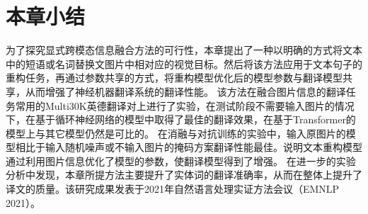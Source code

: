 






\section{本章小结}
为了探究显式跨模态信息融合方法的可行性，本章提出了一种以明确的方式将文本中的短语或名词替换文图片中相对应的视觉目标。然后将该方法应用于文本句子的重构任务，再通过参数共享的方式，将重构模型优化后的模型参数与翻译模型共享，从而增强了神经机器翻译系统的翻译性能。
该方法在融合图片信息的翻译任务常用的Multi30K英德翻译对上进行了实验，在测试阶段不需要输入图片的情况下，在基于循环神经网络的模型中取得了最佳的翻译效果，在基于Transformer的模型上与其它模型仍然是可比的。
在消融与对抗训练的实验中，输入原图片的模型相比于输入随机噪声或不输入图片的掩码方案翻译性能最佳。说明文本重构模型通过利用图片信息优化了模型的参数，使翻译模型得到了增强。
在进一步的实验分析中发现，本章所提方法主要提升了实体词的翻译准确率，从而在整体上提升了译文的质量。该研究成果发表于2021年自然语言处理实证方法会议（EMNLP 2021）。


